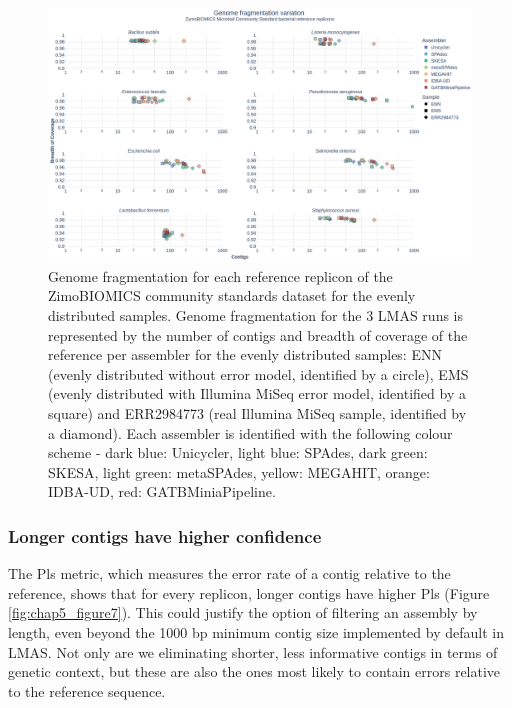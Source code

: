 \begin{figure}[h!]
\centering
\includegraphics[width=\textwidth]{figures/chapter 5/Figure 6.png}
\caption{Genome fragmentation for each reference replicon of the ZimoBIOMICS community standards dataset for the evenly distributed samples. Genome fragmentation for the 3 LMAS runs is represented by the number of contigs and breadth of coverage of the reference per assembler for the evenly distributed samples: ENN (evenly distributed without error model, identified by a circle), EMS (evenly distributed with Illumina MiSeq error model, identified by a square) and ERR2984773 (real Illumina MiSeq sample, identified by a diamond). Each assembler is identified with the following colour scheme - dark blue: Unicycler, light blue: SPAdes, dark green: SKESA, light green: metaSPAdes, yellow: MEGAHIT, orange: IDBA-UD, red: GATBMiniaPipeline.}
\label{fig:chap5_figure6}
\end{figure}

\subsubsection{Longer contigs have higher confidence}

The \ac{Pls} metric, which measures the error rate of a contig relative to the reference, shows that for every replicon, longer contigs have higher \ac{Pls} (Figure \ref{fig:chap5_figure7}). This could justify the option of filtering an assembly by length, even beyond the 1000 \ac{bp} minimum contig size implemented by default in LMAS. Not only are we eliminating shorter, less informative contigs in terms of genetic context, but these are also the ones most likely to contain errors relative to the reference sequence. 

